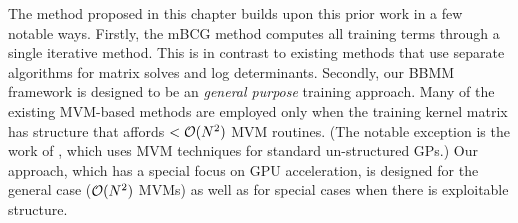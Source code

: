 The method proposed in this chapter builds upon this prior work in a few notable ways.
Firstly, the mBCG method computes all training terms through a single iterative method.
This is in contrast to existing methods that use separate algorithms for matrix solves and log determinants.
Secondly, our BBMM framework is designed to be an \emph{general purpose} training approach.
Many of the existing MVM-based methods are employed only when the training kernel matrix has structure that affords $< \bigo{N^2}$ MVM routines.
(The notable exception is the work of \citet{cutajar2016preconditioning}, which uses MVM techniques for standard un-structured GPs.)
Our approach, which has a special focus on GPU acceleration, is designed for the general case ($\bigo{N^2}$ MVMs) as well as for special cases when there is exploitable structure.
